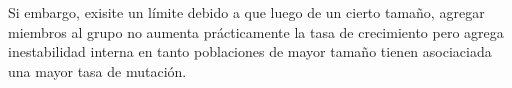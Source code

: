 \documentclass[a4paper,10pt]{article}
\begin{document}
Si embargo, exisite un límite debido a que luego de un cierto tamaño, agregar miembros al grupo no aumenta prácticamente 
la tasa de crecimiento pero agrega inestabilidad interna en tanto poblaciones de mayor tamaño tienen asociaciada una mayor tasa de mutación.



% 
% 
% 
% 
% 
% 
% 
% 
\end{document}
